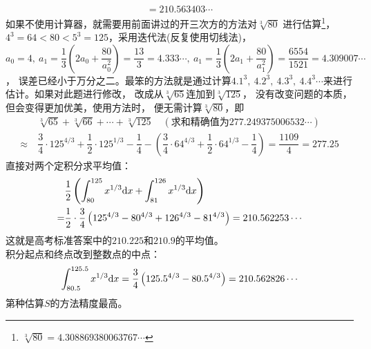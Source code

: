 \begin{enumerate}[label={【\textbf{例\thechapter.\arabic*}】},
 leftmargin=\inteval{\myenumleftmargin}pt,
 itemsep=\inteval{\myenumitempsep}pt,
 itemindent=\inteval{\myenumitemindent}pt]
\begin{align*}
    =210.563403\cdots
\end{align*}
如果不使用计算器，就需要用前面讲过的开三次方的方法对$ \sqrt[3]{80} $
进行估算\footnote{\q $ \sqrt[3]{80}=4.308869380063767\cdots $}，
$ 4^3=64<80<5^3=125 $，采用迭代法(反复使用切线法)，
$ a_0=4,\ a_1=\dfrac{1}{3}(2a_0+
\dfrac{80}{a_0^2})=\dfrac{13}{3}=4.333\cdots,\ a_1=\dfrac{1}{3}(2a_1+
\dfrac{80}{a_1^2})=\dfrac{6554}{1521}=4.309007\cdots $，
误差已经小于万分之二。最笨的方法就是通过计算$ 4.1^3,
\ 4.2^3,\ 4.3^3,\ 4.4^3\cdots $来进行估计。如果对此题进行修改，
改成从$ \sqrt[3]{65} $连加到$ \sqrt[3]{125} $，
没有改变问题的本质，但会变得更加优美，使用方法时，
便无需计算$ \sqrt[3]{80} $，即
\begin{align*}
    &\ \sqrt[3]{65}+\sqrt[3]{66}+\cdots+\sqrt[3]{125}
    \quad (\text{求和精确值为}277.249375006532\cdots)\\
    \approx &\ \dfrac{3}{4}\cdot 125^{4/3}+\dfrac{1}{2}\cdot 125^{1/3}-\dfrac{1}{4}-
    \left(\dfrac{3}{4}\cdot 64^{4/3}+\dfrac{1}{2}\cdot 64^{1/3}-\dfrac{1}{4} \right) 
    =\dfrac{1109}{4}=277.25
\end{align*}
直接对两个定积分求平均值：
\begin{align*}
    &\dfrac{1}{2}\left(\int_{80}^{125}x^{1/3}\mathrm{d} x+\int_{81}^{126}x^{1/3}\mathrm{d} x \right) \\
    =&\dfrac{1}{2}\cdot \dfrac{3}{4}\left( 125^{4/3} -80^{4/3}+126^{4/3}-
    81^{4/3} \right)= 210.562253 \cdots
\end{align*}
这就是高考标准答案中的$ 210.225 $和$ 210.9 $的平均值。\\
积分起点和终点改到整数点的中点：
\begin{align*}
    \int_{80.5}^{125.5}x^{1/3}\mathrm{d} x=
    \dfrac{3}{4}\left(125.5^{4/3} - 80.5^{4/3}\right) =210.562826 \cdots
\end{align*}
第种估算$ S $的方法精度最高。


\end{enumerate}
